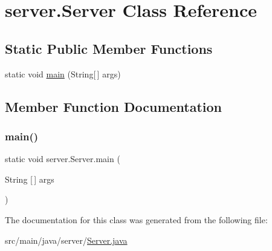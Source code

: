 \hypertarget{classserver_1_1_server}{}\section{server.\+Server Class Reference}
\label{classserver_1_1_server}
\subsection*{Static Public Member Functions}
\begin{DoxyCompactItemize}
\item 
static void \hyperlink{classserver_1_1_server_acd8e4cb5c187614b7bb0160103e61083}{main} (String\mbox{[}$\,$\mbox{]} args)
\end{DoxyCompactItemize}


\subsection{Member Function Documentation}
\mbox{\label{classserver_1_1_server_acd8e4cb5c187614b7bb0160103e61083}} 
\subsubsection{\texorpdfstring{main()}{main()}}
{\footnotesize\ttfamily static void server.\+Server.\+main (\begin{DoxyParamCaption}\item[{String \mbox{[}$\,$\mbox{]}}]{args }\end{DoxyParamCaption})\hspace{0.3cm}{\ttfamily [static]}}



The documentation for this class was generated from the following file\+:\begin{DoxyCompactItemize}
\item 
src/main/java/server/\hyperlink{_server_8java}{Server.\+java}\end{DoxyCompactItemize}
